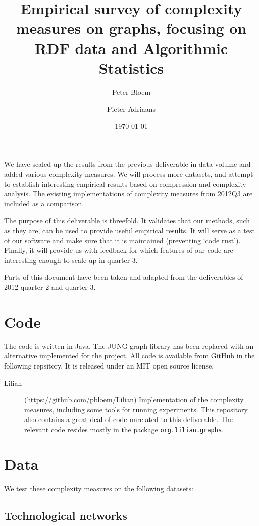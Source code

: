 \documentclass{article}
\author{Peter Bloem \and Pieter Adriaans}
\title{Empirical survey of complexity measures on graphs, focusing on RDF data and Algorithmic Statistics}
\date{\today}
\begin{document}
\maketitle

We have scaled up the results from the previous deliverable in data volume and added various complexity measures. We will process more datasets, and attempt to establish interesting empirical results based on compression and complexity analysis. The existing implementations of complexity measures from 2012Q3 are included as a comparison.

The purpose of this deliverable is threefold. It validates that our methods, such as they are, can be used to provide useful empirical results. It will serve as a test of our software and make sure that it is maintained (preventing `code rust'). Finally, it will provide us with feedback for which features of our code are interesting enough to scale up in quarter 3.

Parts of this document have been taken and adapted from the deliverables of 2012 quarter 2 and quarter 3.

\section*{Code}

The code is written in Java. The JUNG graph library has been replaced with an alternative implemented for the project. All code is available from GitHub in the following repsitory. It is released under an MIT open source license. 
\begin{description}
\item[Lilian] (\url{https://github.com/pbloem/Lilian}) Implementation of the complexity measures, including some tools for running experiments. This repository also contains a great deal of code unrelated to this deliverable. The relevant code resides mostly in the package \texttt{org.lilian.graphs}.
\end{description}

\section{Data}

We test these complexity measures on the following datasets:

\subsection*{Technological networks}
\end{document}

